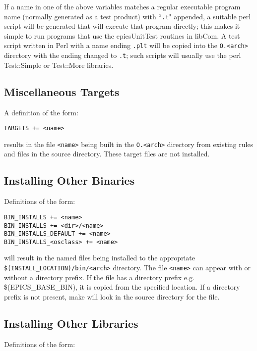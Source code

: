 If a name in one of the above variables matches a regular executable program name (normally generated as a test product) 
with ``\verb|.t|" appended, a suitable perl script will be generated that will execute that program directly; this makes it simple to 
run programs that use the epicsUnitTest routines in libCom.  A test script written in Perl with a name ending \verb|.plt| will be 
copied into the \verb|O.<arch>| directory with the ending changed to \verb|.t|; such scripts will usually use the perl Test::Simple or 
Test::More libraries.

\subsection{Miscellaneous Targets}

A definition of the form:

\begin{verbatim}
TARGETS += <name>
\end{verbatim}

results in the file \verb|<name>| being built in the \verb|O.<arch>| directory from existing rules and files in the source directory. These 
target files are not installed.

\subsection{Installing Other Binaries}

Definitions of the form:

\begin{verbatim}
BIN_INSTALLS += <name>
BIN_INSTALLS += <dir>/<name>
BIN_INSTALLS_DEFAULT += <name>
BIN_INSTALLS_<osclass> += <name>
\end{verbatim}

will result in the named files being installed to the appropriate \verb|$(INSTALL_LOCATION)/bin/<arch>| directory. The file 
\verb|<name>| can appear with or without a directory prefix. If the file has a directory prefix e.g. \$(EPICS\_BASE\_BIN), it is 
copied from the specified location. If a directory prefix is not present, make will look in the source directory for the file.

\subsection{Installing Other Libraries}

Definitions of the form:


